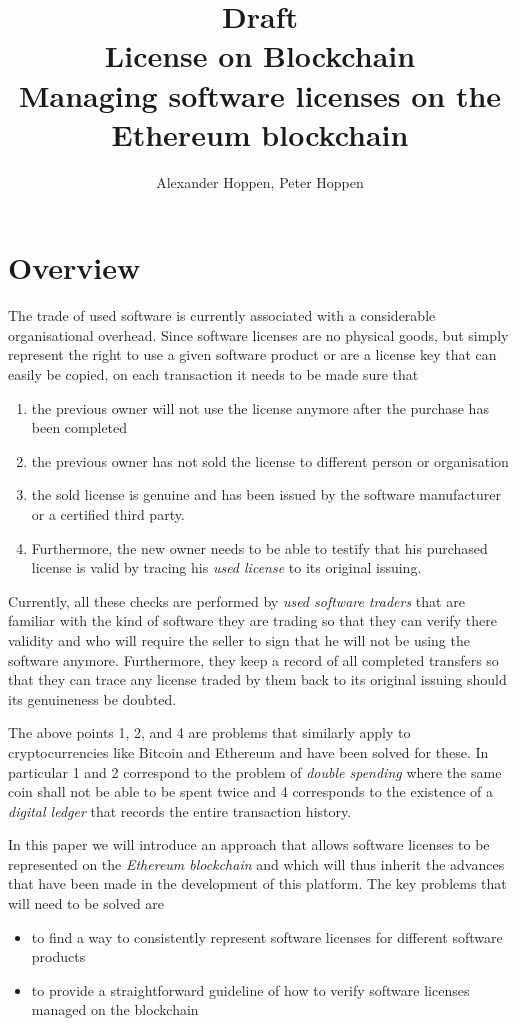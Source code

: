 \documentclass[a4paper]{article}
\title{\textsf{\Huge Draft} \\[3mm] License on Blockchain \\[2mm] \large Managing software licenses on the Ethereum blockchain}
\author{Alexander Hoppen, Peter Hoppen}
\begin{document}
\maketitle



\section{Overview}

The trade of used software is currently associated with a considerable organisational overhead. Since software licenses are no physical goods, but simply represent the right to use a given software product or are a license key that can easily be copied, on each transaction it needs to be made sure that
\begin{enumerate}
  \item the previous owner will not use the license anymore after the purchase has been completed
  \item the previous owner has not sold the license to different person or organisation
  \item the sold license is genuine and has been issued by the software manufacturer or a certified third party.
  \item Furthermore, the new owner needs to be able to testify that his purchased license is valid by tracing his \emph{used license} to its original issuing.
\end{enumerate}

Currently, all these checks are performed by \emph{used software traders} that are familiar with the kind of software they are trading so that they can verify there validity and who will require the seller to sign that he will not be using the software anymore. Furthermore, they keep a record of all completed transfers so that they can trace any license traded by them back to its original issuing should its genuineness be doubted. 

The above points 1, 2, and 4 are problems that similarly apply to cryptocurrencies like Bitcoin and Ethereum and have been solved for these. In particular 1 and 2 correspond to the problem of \emph{double spending} where the same coin shall not be able to be spent twice and 4 corresponds to the existence of a \emph{digital ledger} that records the entire transaction history.

In this paper we will introduce an approach that allows software licenses to be represented on the \emph{Ethereum blockchain} and which will thus inherit the advances that have been made in the development of this platform. The key problems that will need to be solved are
\begin{itemize}
  \item to find a way to consistently represent software licenses for different software products
  \item to provide a straightforward guideline of how to verify software licenses managed on the blockchain
\end{itemize}
\end{document}
